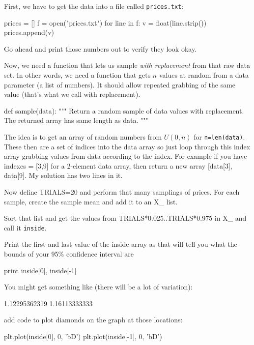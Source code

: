 \begin{fullwidth}
\step First, we have to get the data into a file called {\tt prices.txt}:

\begin{pyverbatim}
prices = []
f = open("prices.txt")
for line in f:
	v = float(line.strip())
	prices.append(v)
\end{pyverbatim}

Go ahead and print those numbers out to verify they look okay.

\step Now, we need a function that lets us sample {\em with replacement} from that raw data set. In other words, we need a function that gets $n$ values at random from a data parameter (a list of numbers). It should allow repeated grabbing of the same value (that's what we call with replacement).

\begin{pyverbatim}
def sample(data):
	"""
	Return a random sample of data values with replacement.
	The returned array has same length as data.
	"""
\end{pyverbatim}

The idea is to get an array of random numbers from $U(0,n)$ for {\tt n=len(data)}. These then are a set of indices into the data array so just loop through this index array grabbing values from data according to the index. For example if you have indexes = [3,9] for a 2-element data array, then return a new array [data[3], data[9]. My solution has two lines in it.

\step Now define TRIALS=20 and perform that many samplings of prices. For each sample, create the sample mean and add it to an X\_ list.

\step Sort that list and get the values from TRIALS*0.025..TRIALS*0.975 in X\_ and call it {\tt inside}.

\step Print the first and last value of the inside array as that will tell you what the bounds of your 95\% confidence interval are

\begin{pyverbatim}
print inside[0], inside[-1]
\end{pyverbatim}

You might get something like (there will be a lot of variation):

1.12295362319 1.16113333333

add code to plot diamonds on the graph at those locations:

\begin{pyverbatim}
plt.plot(inside[0], 0, 'bD')
plt.plot(inside[-1], 0, 'bD')
\end{pyverbatim}


\end{fullwidth}
